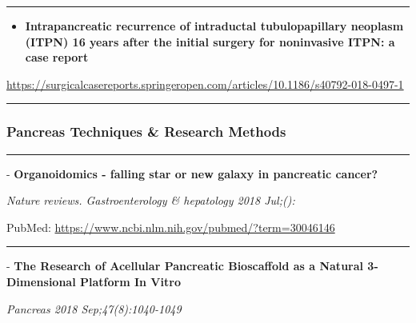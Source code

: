 \documentclass[]{article}
\providecommand{\tightlist}{%
  \setlength{\itemsep}{0pt}\setlength{\parskip}{0pt}}
\begin{document}
{}

{}

\begin{center}\rule{0.5\linewidth}{\linethickness}\end{center}

\begin{itemize}
\tightlist
\item
  \textbf{Intrapancreatic recurrence of intraductal tubulopapillary
  neoplasm (ITPN) 16 years after the initial surgery for noninvasive
  ITPN: a case report}
\end{itemize}

\url{https://surgicalcasereports.springeropen.com/articles/10.1186/s40792-018-0497-1}

\begin{center}\rule{0.5\linewidth}{\linethickness}\end{center}

\hypertarget{pancreas-techniques-research-methods}{%
\subsubsection{Pancreas Techniques \& Research
Methods}\label{pancreas-techniques-research-methods}}

\begin{center}\rule{0.5\linewidth}{\linethickness}\end{center}

 - \textbf{Organoidomics - falling star or new galaxy in pancreatic
cancer?}

\emph{Nature reviews. Gastroenterology \& hepatology 2018 Jul;():}

PubMed: \url{https://www.ncbi.nlm.nih.gov/pubmed/?term=30046146}

{}

{}

\begin{center}\rule{0.5\linewidth}{\linethickness}\end{center}

 - \textbf{The Research of Acellular Pancreatic Bioscaffold as a Natural
3-Dimensional Platform In Vitro}

\emph{Pancreas 2018 Sep;47(8):1040-1049}
\end{document}
